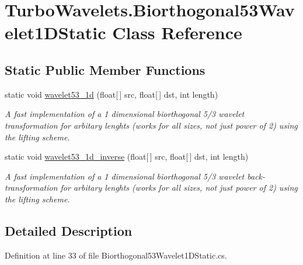 \hypertarget{class_turbo_wavelets_1_1_biorthogonal53_wavelet1_d_static}{\section{\-Turbo\-Wavelets.\-Biorthogonal53\-Wavelet1\-D\-Static \-Class \-Reference}
\label{class_turbo_wavelets_1_1_biorthogonal53_wavelet1_d_static}
}
\subsection*{\-Static \-Public \-Member \-Functions}
\begin{DoxyCompactItemize}
\item 
static void \hyperlink{class_turbo_wavelets_1_1_biorthogonal53_wavelet1_d_static_ae7119dd839f9c317e69f7cceadf6da82}{wavelet53\-\_\-1d} (float\mbox{[}$\,$\mbox{]} src, float\mbox{[}$\,$\mbox{]} dst, int length)
\begin{DoxyCompactList}\small\item\em \-A fast implementation of a 1 dimensional biorthogonal 5/3 wavelet transformation for arbitary lenghts (works for all sizes, not just power of 2) using the lifting scheme. \end{DoxyCompactList}\item 
static void \hyperlink{class_turbo_wavelets_1_1_biorthogonal53_wavelet1_d_static_a9fd288d382428a089990d1e3f6367657}{wavelet53\-\_\-1d\-\_\-inverse} (float\mbox{[}$\,$\mbox{]} src, float\mbox{[}$\,$\mbox{]} dst, int length)
\begin{DoxyCompactList}\small\item\em \-A fast implementation of a 1 dimensional biorthogonal 5/3 wavelet back-\/transformation for arbitary lenghts (works for all sizes, not just power of 2) using the lifting scheme. \end{DoxyCompactList}\end{DoxyCompactItemize}


\subsection{\-Detailed \-Description}


\-Definition at line 33 of file \-Biorthogonal53\-Wavelet1\-D\-Static.\-cs.



